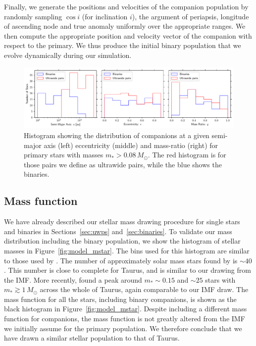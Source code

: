 \documentclass{aa}
\begin{document}
Finally, we generate the positions and velocities of the companion population by randomly sampling $\cos i$ (for inclination $i$), the argument of periapsis, longitude of ascending node and true anomaly uniformly over the appropriate ranges. We then compute the appropriate position and velocity vector of the companion with respect to the primary. We thus produce the initial binary population that we evolve dynamically during our simulation. 

\begin{figure}
    \centering
    \includegraphics[width=\textwidth]{Figures/binary_statistics.pdf}
    \caption{{Histogram showing the distribution of companions at a given semi-major axis (left) eccentricity (middle) and mass-ratio (right) for primary stars with masses $m_*>0.08\, M_\odot$. The red histogram is for those pairs we define as ultrawide pairs, while the blue shows the binaries.} }
    \label{fig:binstats}
\end{figure}



\subsection{Mass function}

We have already described our stellar mass drawing procedure for single stars and binaries in Sections~\ref{sec:uwps} and~\ref{sec:binaries}. To validate our mass distribution including the binary population, we show the histogram of stellar masses in Figure~\ref{fig:model_mstar}. The bins used for this histogram are similar to those used by \citet[][top panel of their Figure~13]{Luhman04}. The number of approximately solar mass stars found by \citet{Luhman04} is $\sim 40$. This number is close to complete for Taurus, and is similar to our drawing from the IMF. More recently, \citet{Esplin19} found a peak around $m_*\sim 0.15$ and $\sim 25$ stars with $m_*\gtrsim 1 \, M_\odot$ across the whole of Taurus, again comparable to our IMF draw. The mass function for all the stars, including binary companions, is shown as the black histogram in Figure~\ref{fig:model_mstar}. Despite including a different mass function for companions, the mass function is not greatly altered from the \citet{Kro01} IMF we initially assume for the primary population. We therefore conclude that we have drawn a similar stellar population to that of Taurus. 
\end{document}
